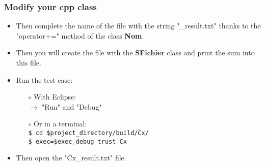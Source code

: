 \documentclass[10pt, hyperref={unicode=true,pdfusetitle, bookmarks=true,bookmarksnumbered=false,bookmarksopen=false, breaklinks=false,pdfborder={0 0 1},backref=true,colorlinks=true,linkcolor=darkblue,pageanchor, urlcolor=darkblue}]{beamer}
\begin{document}
\begin{frame}
\frametitle{Modify your cpp class}
\begin{block}{}

\begin{itemize}
\item Then complete the name of the file with the string "\_result.txt" thanks to the "operator+=" method of the class \textbf{Nom}.

\item Then you will create the file with the \textbf{SFichier} class and print the sum into this file.

\item Run the test case:\\
    \begin{itemize}
    \item [$\circ$] With Eclipse:\\
    $\rightarrow$ "Run" and "Debug"\\
    \item [$\circ$] Or in a terminal:\\
    \texttt{\$ cd \$project\_directory/build/Cx/}\\
    \texttt{\$ exec=\$exec\_debug trust Cx}
    \end{itemize}

\item Then open the "Cx\_result.txt" file.
\end{itemize}

\end{block}
\end{frame}
\end{document}
